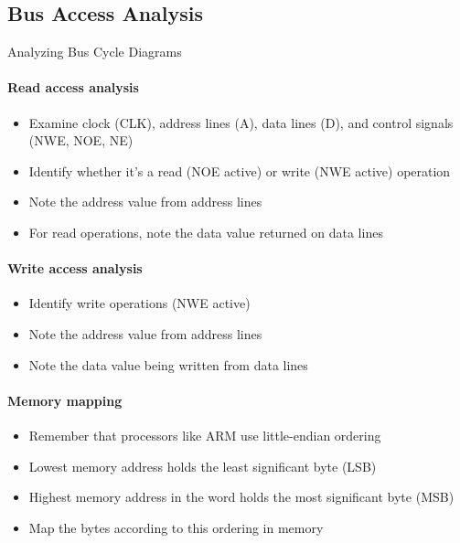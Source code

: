 \subsection{Bus Access Analysis}

\begin{KR}{Analyzing Bus Cycle Diagrams}
\paragraph{Read access analysis}
\begin{itemize}
    \item Examine clock (CLK), address lines (A), data lines (D), and control signals (NWE, NOE, NE)
    \item Identify whether it's a read (NOE active) or write (NWE active) operation
    \item Note the address value from address lines
    \item For read operations, note the data value returned on data lines
\end{itemize}

\paragraph{Write access analysis}
\begin{itemize}
    \item Identify write operations (NWE active)
    \item Note the address value from address lines
    \item Note the data value being written from data lines
\end{itemize}

\paragraph{Memory mapping}
\begin{itemize}
    \item Remember that processors like ARM use little-endian ordering
    \item Lowest memory address holds the least significant byte (LSB)
    \item Highest memory address in the word holds the most significant byte (MSB)
    \item Map the bytes according to this ordering in memory
\end{itemize}
\end{KR}

